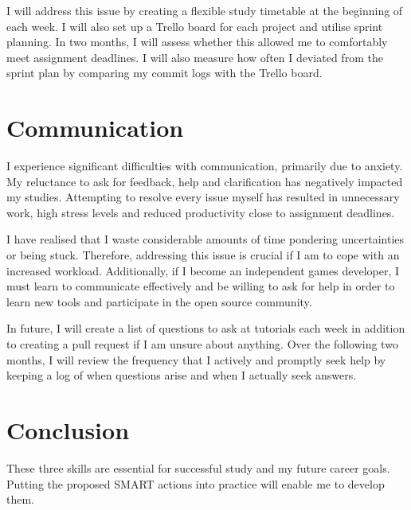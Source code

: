 \documentclass{scrartcl}
\begin{document}
I will address this issue by creating a flexible study timetable at the beginning of each week. I will also set up a Trello board for each project and utilise sprint planning. In two months, I will assess whether this allowed me to comfortably meet assignment deadlines. I will also measure how often I deviated from the sprint plan by comparing my commit logs with the Trello board.

\section{Communication}
I experience significant difficulties with communication, primarily due to anxiety. My reluctance to ask for feedback, help and clarification has negatively impacted my studies. Attempting to resolve every issue myself has resulted in unnecessary work, high stress levels and reduced productivity close to assignment deadlines.

I have realised that I waste considerable amounts of time pondering uncertainties or being stuck. Therefore, addressing this issue is crucial if I am to cope with an increased workload. Additionally, if I become an independent games developer, I must learn to communicate effectively and be willing to ask for help in order to learn new tools and participate in the open source community.

In future, I will create a list of questions to ask at tutorials each week in addition to creating a pull request if I am unsure about anything. Over the following two months, I will review the frequency that I actively and promptly seek help by keeping a log of when questions arise and when I actually seek answers.

\section{Conclusion}
These three skills are essential for successful study and my future career goals. Putting the proposed SMART actions into practice will enable me to develop them.


\end{document}
